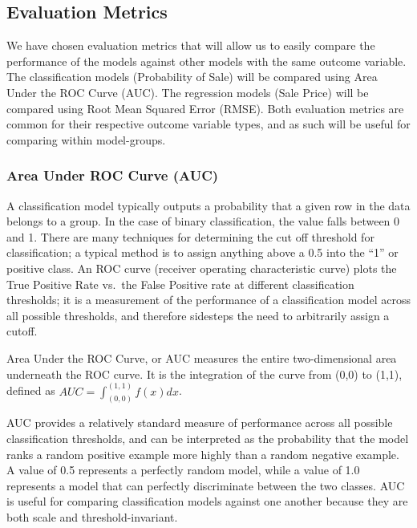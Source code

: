 \documentclass[12pt,]{article}
\begin{document}
\hypertarget{evaluation-metrics}{%
\subsection{Evaluation Metrics}\label{evaluation-metrics}}

We have chosen evaluation metrics that will allow us to easily compare
the performance of the models against other models with the same outcome
variable. The classification models (Probability of Sale) will be
compared using Area Under the ROC Curve (AUC). The regression models
(Sale Price) will be compared using Root Mean Squared Error (RMSE). Both
evaluation metrics are common for their respective outcome variable
types, and as such will be useful for comparing within model-groups.

\hypertarget{area-under-roc-curve-auc}{%
\subsubsection{Area Under ROC Curve
(AUC)}\label{area-under-roc-curve-auc}}

A classification model typically outputs a probability that a given row
in the data belongs to a group. In the case of binary classification,
the value falls between 0 and 1. There are many techniques for
determining the cut off threshold for classification; a typical method
is to assign anything above a 0.5 into the ``1'' or positive class. An
ROC curve (receiver operating characteristic curve) plots the True
Positive Rate vs.~the False Positive rate at different classification
thresholds; it is a measurement of the performance of a classification
model across all possible thresholds, and therefore sidesteps the need
to arbitrarily assign a cutoff.

Area Under the ROC Curve, or AUC measures the entire two-dimensional
area underneath the ROC curve. It is the integration of the curve from
(0,0) to (1,1), defined as \(AUC = \int_{(0,0)}^{(1,1)} f(x)dx\).

AUC provides a relatively standard measure of performance across all
possible classification thresholds, and can be interpreted as the
probability that the model ranks a random positive example more highly
than a random negative example. A value of 0.5 represents a perfectly
random model, while a value of 1.0 represents a model that can perfectly
discriminate between the two classes. AUC is useful for comparing
classification models against one another because they are both scale
and threshold-invariant.
\end{document}
